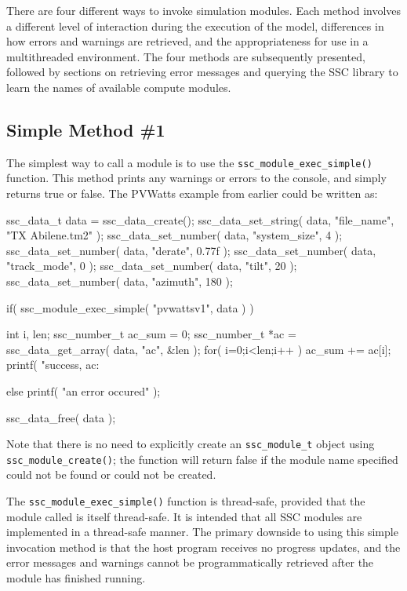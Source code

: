 \documentclass{article}
\begin{document}
There are four different ways to invoke simulation modules.  Each method involves a different level of interaction during the execution of the model, differences in how errors and warnings are retrieved, and the appropriateness for use in a multithreaded environment.  The four methods are subsequently presented, followed by sections on retrieving error messages and querying the SSC library to learn the names of available compute modules.

\subsection{Simple Method \#1}

The simplest way to call a module is to use the \texttt{ssc\_module\_exec\_simple()} function.  This method prints any warnings or errors to the console, and simply returns true or false. The PVWatts example from earlier could be written as:

\begin{verbatimtab}[4]
ssc_data_t data = ssc_data_create();
ssc_data_set_string( data, "file_name", "TX Abilene.tm2" );
ssc_data_set_number( data, "system_size", 4 );
ssc_data_set_number( data, "derate", 0.77f );
ssc_data_set_number( data, "track_mode", 0 );
ssc_data_set_number( data, "tilt", 20 );
ssc_data_set_number( data, "azimuth", 180 );

if( ssc_module_exec_simple( "pvwattsv1", data ) )
{
	int i, len;
	ssc_number_t ac_sum = 0;
	ssc_number_t *ac = ssc_data_get_array( data, "ac", &len );
	for( i=0;i<len;i++ ) ac_sum += ac[i];
	printf( "success, ac: %

}
else
	printf( "an error occured\n" );

ssc_data_free( data );
\end{verbatimtab}

Note that there is no need to explicitly create an \texttt{ssc\_module\_t} object using \texttt{ssc\_module\_create()}; the function will return false if the module name specified could not be found or could not be created.

The \texttt{ssc\_module\_exec\_simple()} function is thread-safe, provided that the module called is itself thread-safe.  It is intended that all SSC modules are implemented in a thread-safe manner.  The primary downside to using this simple invocation method is that the host program receives no progress updates, and the error messages and warnings cannot be programmatically retrieved after the module has finished running.
\end{document}
